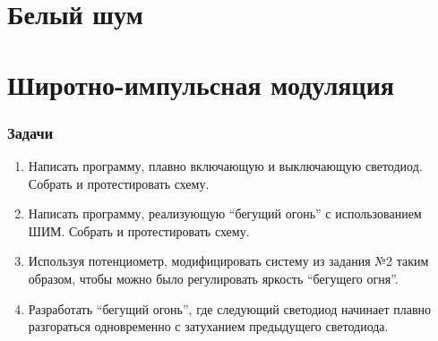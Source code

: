 \documentclass[a4paper,twoside]{book}
\begin{document}




\chapter{Белый шум}







\chapter{Широтно-импульсная модуляция}






\subsection{Задачи}

\begin{enumerate}
\item Написать программу, плавно включающую и выключающую светодиод. Собрать и
  протестировать схему. 
\item Написать программу, реализующую ``бегущий огонь'' с использованием ШИМ.
  Собрать и протестировать схему.
\item Используя потенциометр, модифицировать систему из задания №2 таким
  образом, чтобы можно было регулировать яркость ``бегущего огня''.
\item Разработать ``бегущий огонь'', где следующий светодиод начинает плавно
  разгораться одновременно с затуханием предыдущего светодиода.
\end{enumerate}


\end{document}
